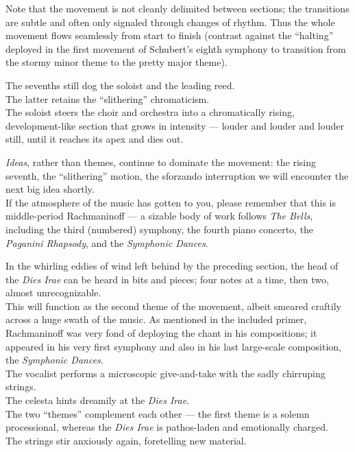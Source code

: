 \documentclass{beamer}
\begin{document}
\begin{frame}
  Note that the movement is not cleanly delimited between sections; the transitions are subtle and often only signaled through changes of rhythm. Thus the whole movement flows seamlessly from start to finish (contrast against the ``halting'' deployed in the first movement of Schubert's eighth symphony to transition from the stormy minor theme to the pretty major theme). 
\end{frame} 

\begin{frame}
  The sevenths still dog the soloist and the leading reed. 
  \pause \\ 
  The latter retains the ``slithering'' chromaticism. 
  \pause \\ 
  The soloist steers the choir and orchestra into a chromatically rising, development-like section that grows in intensity --- louder and louder and louder still, until it reaches its apex and dies out. 
\end{frame} 

\begin{frame} 
  \emph{Ideas}, rather than themes, continue to dominate the movement: the rising seventh, the ``slithering'' motion, the sforzando interruption \textellipsis we will encounter the next big idea shortly. 
  \pause \\ 
  If the atmosphere of the music has gotten to you, please remember that this is middle-period Rachmaninoff --- a sizable body of work follows \textit{The Bells}, including the third (numbered) symphony, the fourth piano concerto, the \textit{Paganini Rhapsody}, and the \textit{Symphonic Dances}. 
\end{frame} 

\begin{frame}
  In the whirling eddies of wind left behind by the preceding section, the head of the \textit{Dies Irae} can be heard in bits and pieces; \pause four notes at a time, \pause then two, almost unrecognizable. 
  \pause \\
  This will function as the second theme of the movement, albeit smeared craftily across a huge swath of the music. As mentioned in the included primer, Rachmaninoff was very fond of deploying the chant in his compositions; it appeared in his very first symphony and also in his last large-scale composition, the \textit{Symphonic Dances}. 
  \pause \\ 
  The vocalist performs a microscopic give-and-take with the sadly chirruping strings. 
  \pause \\ 
  The celesta hints dreamily at the \textit{Dies Irae}. 
  \pause \\ 
  The two ``themes'' complement each other --- the first theme is a solemn processional, whereas the \textit{Dies Irae} is pathos-laden and emotionally charged. 
  \pause \\ 
  The strings stir anxiously again, foretelling new material. 
\end{frame} 
\end{document}
